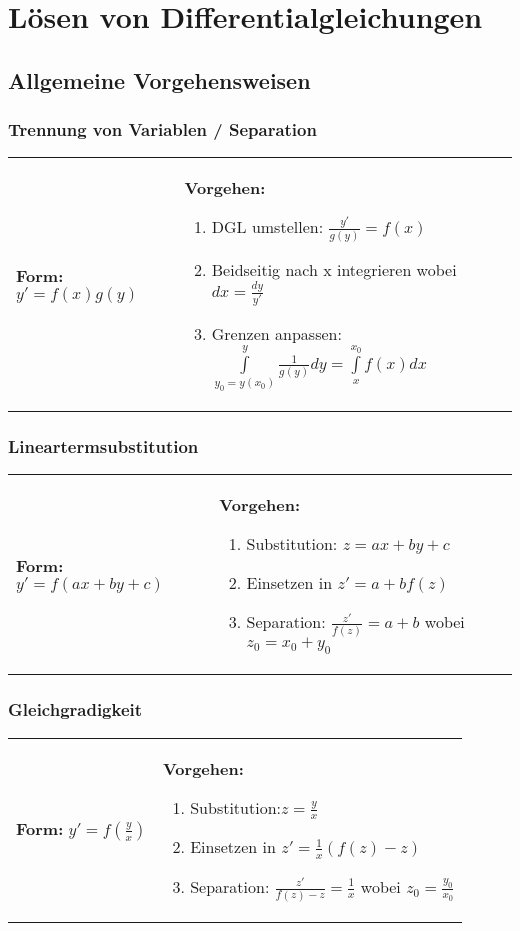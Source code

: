 
\section{Lösen von Differentialgleichungen}
\subsection{Allgemeine Vorgehensweisen}
\subsubsection{Trennung von Variablen / Separation}

\begin{tabular}{p{4cm}p{10.5cm}}
\textbf{Form:} $y' = f(x) g(y)$ &
\textbf{Vorgehen:}
\begin{enumerate}
	\item DGL umstellen: $\frac{y'}{g(y)} = f(x)$
	\item Beidseitig nach x integrieren wobei $dx = \frac{dy}{y'}$
	\item Grenzen anpassen: $\int\limits_{y_0=y(x_0)}^{y} \frac{1}{g(y)} dy = \int\limits_{x}^{x_0}f(x) dx$
\end{enumerate}
\end{tabular}
            
\subsubsection{Lineartermsubstitution}

\begin{tabular}{p{5cm}p{10.5cm}}
\textbf{Form:} $y'=f(ax+by+c)$   &
\textbf{Vorgehen:}
\begin{enumerate}
	\item Substitution: $z=ax+by+c$
	\item Einsetzen in $z'=a+bf(z)$
	\item Separation: $\frac{z'}{f(z)} = a + b$ wobei $z_0 = x_0 + y_0$
\end{enumerate}
\end{tabular}
                
\subsubsection{Gleichgradigkeit}
\begin{tabular}{p{4cm}p{10.5cm}}
\textbf{Form:} $y'=f(\frac{y}{x})$ &
\textbf{Vorgehen:}
\begin{enumerate}
	\item Substitution:\quad $z=\frac{y}{x}$
	\item Einsetzen in $z'=\frac{1}{x}(f(z)-z)$
	\item Separation: $\frac{z'}{f(z)-z} = \frac{1}{x}$ wobei $z_0 = \frac{y_0}{x_0}$ 
\end{enumerate}
\end{tabular}
            
